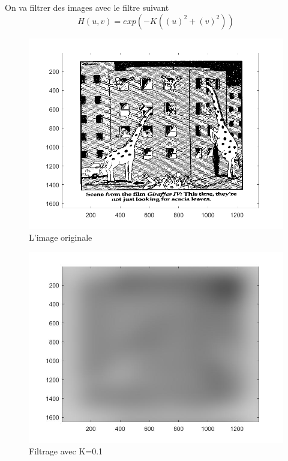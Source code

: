 \documentclass[10pt,a4paper]{article}
\begin{document}
On va filtrer des images avec le filtre suivant
\[
	H(u,v) = exp(-K((u)^2+(v)^2))
\]
\begin{figure}[H]	\begin{center}
\includegraphics[scale=0.35]{girafe_originale.png}
\caption{L'image originale}
\label{s1demod}
\end{center}	\end{figure}



\begin{figure}[H]	\begin{center}
\includegraphics[scale=0.35]{imfiltree_k=0.1.jpg}
\caption{Filtrage avec K=0.1}
\label{s1demod}
\end{center}	\end{figure}
\end{document}
